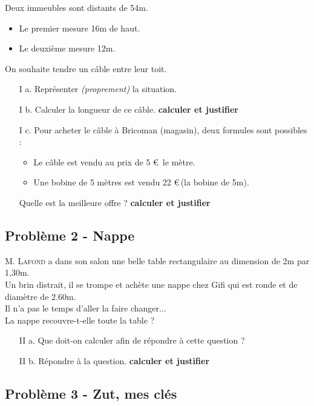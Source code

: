 \documentclass[12pt]{article}
\begin{document}
Deux immeubles sont distants de 54m. 
  \begin{itemize}
  \item Le premier mesure 16m de haut.
  \item Le deuxième mesure 12m. 
  \end{itemize}

On souhaite tendre un câble entre leur toit. 

\begin{enumerate}
  \item[I a.] Représenter \textit{(proprement)} la situation.

  \item[I b.] Calculer la longueur de ce câble. \textbf{calculer et justifier}

  \item[I c.] Pour acheter le câble à Bricoman (magasin), deux formules sont possibles :  
  \begin{itemize}
  \item Le câble est vendu  au prix de 5 \euro \, le mètre. 
  \item Une bobine de 5 mètres est vendu 22 \euro \,(la bobine de 5m). 
  \end{itemize} 
  Quelle est la meilleure offre ? \textbf{calculer et justifier}
\end{enumerate}

\subsection*{Problème 2 - Nappe}

\textsc{M. Lafond} a dans son salon une belle table rectangulaire au dimension de 2m par 1,30m. \\
Un brin distrait, il se trompe et achète une nappe chez Gifi qui est ronde et de diamètre de 2.60m. \\
Il n'a pas le temps d'aller la faire changer... \\
La nappe recouvre-t-elle toute la table ?

\begin{enumerate}
  \item[II a.] Que doit-on calculer afin de répondre à cette question ?

  \item[II b.] Répondre à la question. \textbf{calculer et justifier}
\end{enumerate}

\subsection*{Problème 3 - Zut, mes clés}
\end{document}
